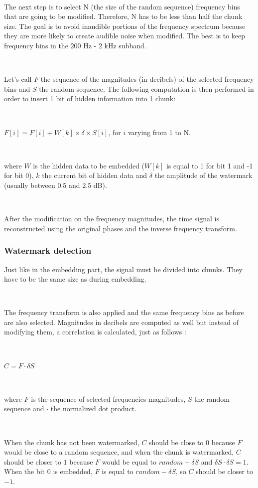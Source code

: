 ~

The next step is to select N (the size of the random sequence) frequency bins that are going to be modified. Therefore, N has to be less than half the chunk size. The goal is to avoid inaudible portions of the frequency spectrum because they are more likely to create audible noise when modified. The best is to keep frequency bins in the $200$ Hz - $2$ kHz subband.

~

Let's call $F$ the sequence of the magnitudes (in decibels) of the selected frequency bins and $S$ the random sequence. The following computation is then performed in order to insert 1 bit of hidden information into 1 chunk:

~

$F[i] = F[i] + W[k] \times \delta \times S[i]$, for $i$ varying from 1 to N.

~

\noindent where $W$ is the hidden data to be embedded ($W[k]$ is equal to 1 for bit 1 and -1 for bit 0), $k$ the current bit of hidden data and $\delta$ the amplitude of the watermark (usually between $0.5$ and $2.5$ dB).

~

After the modification on the frequency magnitudes, the time signal is reconstructed using the original phases and the inverse frequency transform.

\subsubsection{Watermark detection}

Just like in the embedding part, the signal must be divided into chunks. They have to be the same size as during embedding.

~

The frequency transform is also applied and the same frequency bins as before are also selected. Magnitudes in decibels are computed as well but instead of modifying them, a correlation is calculated, just as follows :

~

$C = F \cdot \delta S$

~

\noindent where $F$ is the sequence of selected frequencies magnitudes, $S$ the random sequence and $\cdot$ the normalized dot product.

~

When the chunk has not been watermarked, $C$ should be close to $0$ because $F$ would be close to a random sequence, and when the chunk is watermarked, $C$ should be closer to $1$ because $F$ would be equal to $random + \delta S$ and $\delta S \cdot \delta S = 1$. When the bit 0 is embedded, $F$ is equal to $random - \delta S$, so $C$ should be closer to $-1$.

